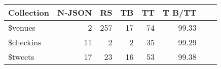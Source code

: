 
  \begin{tabular}{l|rrrrrrr}
    \toprule    
    Collection & N-JSON & RS &TB & TT &T B/TT\\
    \midrule   
    \$venues & 2   &  257  & 17  &  74  & 99.33\\
     \$checkins  & 11  & 2  & 2  &  35  & 99.29\\
     \$tweets  & 17  &  23  & 16  &  53  & 99.38 \\
  \bottomrule
\end{tabular}